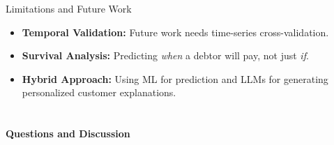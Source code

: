\documentclass[10pt]{beamer}
\begin{document}
\begin{frame}{\textrm{Limitations and Future Work}}
    \begin{itemize}
        \item \textbf{Temporal Validation:} Future work needs time-series cross-validation.
        \item \textbf{Survival Analysis:} Predicting \textit{when} a debtor will pay, not just \textit{if}.
        \item \textbf{Hybrid Approach:} Using ML for prediction and LLMs for generating personalized customer explanations.
    \end{itemize}
\end{frame}

\section*{}  
\begin{frame}
\textcolor{hkustblue}{\Huge{}}
\vfill
\centering
\textbf{Questions and Discussion}
\end{frame}
\end{document}
